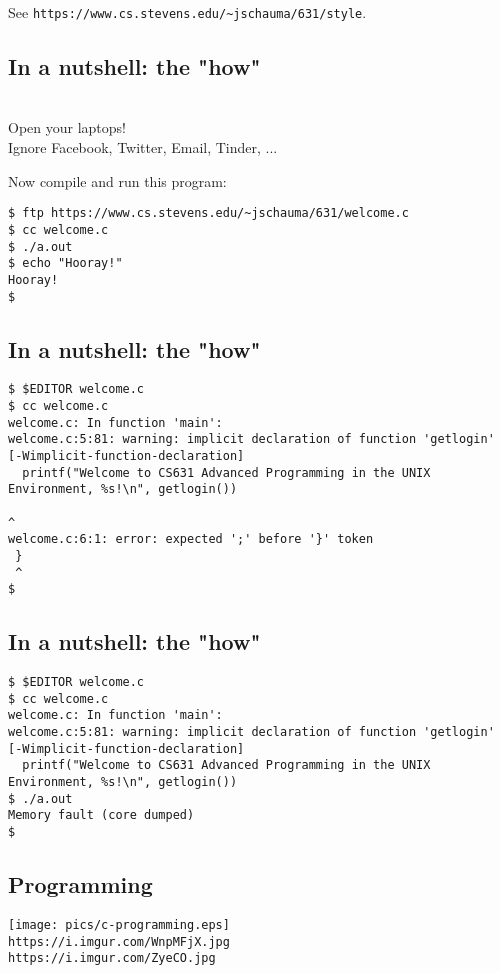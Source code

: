 \documentclass[sxga]{xdvislides}
\begin{document}
See {\tt https://www.cs.stevens.edu/\~{}jschauma/631/style}.

\subsection{In a nutshell: the "how"}
\\

\Hugesize
Open your laptops! \\
\small
Ignore Facebook, Twitter, Email, Tinder, ... \\
\vspace{.25in}

\Hugesize
Now compile and run this program: \\
\Normalsize

\begin{verbatim}
$ ftp https://www.cs.stevens.edu/~jschauma/631/welcome.c
$ cc welcome.c
$ ./a.out
$ echo "Hooray!"
Hooray!
$
\end{verbatim}

\subsection{In a nutshell: the "how"}
\begin{verbatim}
$ $EDITOR welcome.c
$ cc welcome.c
welcome.c: In function 'main':
welcome.c:5:81: warning: implicit declaration of function 'getlogin' [-Wimplicit-function-declaration]
  printf("Welcome to CS631 Advanced Programming in the UNIX Environment, %s!\n", getlogin())
                                                                                 ^
welcome.c:6:1: error: expected ';' before '}' token
 }
 ^
$
\end{verbatim}

\subsection{In a nutshell: the "how"}
\begin{verbatim}
$ $EDITOR welcome.c
$ cc welcome.c
welcome.c: In function 'main':
welcome.c:5:81: warning: implicit declaration of function 'getlogin' [-Wimplicit-function-declaration]
  printf("Welcome to CS631 Advanced Programming in the UNIX Environment, %s!\n", getlogin())
$ ./a.out
Memory fault (core dumped)
$
\end{verbatim}

\subsection{Programming}
\begin{center}
\texttt{[image: pics/c-programming.eps]} \\
\vspace{.5in}
\verb+https://i.imgur.com/WnpMFjX.jpg+ \\
\verb+https://i.imgur.com/ZyeCO.jpg+
\end{center}
\end{document}
